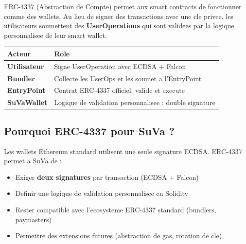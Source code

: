 \documentclass[11pt,a4paper]{article}
\begin{document}
ERC-4337 (Abstraction de Compte) permet aux smart contracts de fonctionner comme des wallets.
Au lieu de signer des transactions avec une cle privee, les utilisateurs soumettent des
\textbf{UserOperations} qui sont validees par la logique personnalisee de leur smart wallet.

\begin{center}
\end{center}

\begin{center}
\begin{tabular}{ll}
\toprule
\textbf{Acteur} & \textbf{Role} \\
\midrule
\textbf{Utilisateur} & Signe UserOperation avec ECDSA + Falcon \\
\textbf{Bundler}     & Collecte les UserOps et les soumet a l'EntryPoint \\
\textbf{EntryPoint}  & Contrat ERC-4337 officiel, valide et execute \\
\textbf{SuVaWallet}  & Logique de validation personnalisee : double signature \\
\bottomrule
\end{tabular}
\end{center}

\subsection{Pourquoi ERC-4337 pour SuVa ?}

Les wallets Ethereum standard utilisent une seule signature ECDSA. ERC-4337 permet a SuVa de :
\begin{itemize}
  \item Exiger \textbf{deux signatures} par transaction (ECDSA + Falcon)
  \item Definir une logique de validation personnalisee en Solidity
  \item Rester compatible avec l'ecosysteme ERC-4337 standard (bundlers, paymasters)
  \item Permettre des extensions futures (abstraction de gas, rotation de cle)
\end{itemize}
\end{document}
